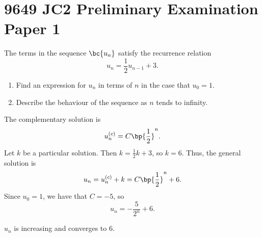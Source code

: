 \section{9649 JC2 Preliminary Examination Paper 1}

\begin{problem}
    The terms in the sequence $\bc{u_n}$ satisfy the recurrence relation \[u_n = \frac12 u_{n-1} + 3.\]

    \begin{enumerate}
        \item Find an expression for $u_n$ in terms of $n$ in the case that $u_0 = 1$.
        \item Describe the behaviour of the sequence as $n$ tends to infinity.
    \end{enumerate}
\end{problem}
\begin{solution}
    \begin{ppart}
        The complementary solution is \[u_n^{(c)} = C \bp{\frac12}^n.\] Let $k$ be a particular solution. Then $k =  \frac12 k + 3$, so $k = 6$. Thus, the general solution is \[u_n = u_{n}^{(c)} + k = C \bp{\frac12}^n + 6.\] Since $u_0 = 1$, we have that $C = -5$, so \[u_n = -\frac{5}{2^n} + 6.\]
    \end{ppart}
    \begin{ppart}
        $u_n$ is increasing and converges to 6.
    \end{ppart}
\end{solution}

